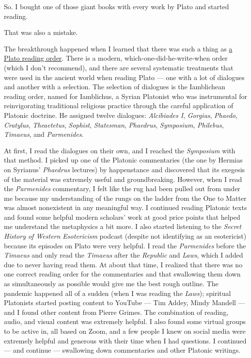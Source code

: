 \documentclass[
]{book}
\begin{document}
So. I bought one of those giant books with every work by Plato and started reading.

That was also a mistake.

The breakthrough happened when I learned that there was such a thing as \href{https://www.oxfordhandbooks.com/view/10.1093/oxfordhb/9780199935314.001.0001/oxfordhb-9780199935314-e-28\#:~:text=According\%20to\%20Iamblichus\%2C\%20for\%20example,and\%20finally\%20Timaeus\%20and\%20Parmenides.}{a Plato reading order}. There is a modern, which-one-did-he-write-when order (which I don't recommend), and there are several systematic treatments that were used in the ancient world when reading Plato --- one with a lot of dialogues and another with a selection. The selection of dialogues is the Iamblichean reading order, named for Iamblichus, a Syrian Platonist who was instrumental for reinvigorating traditional religious practice through the careful application of Platonic doctrine. He assigned twelve dialogues: \emph{Alcibiades I}, \emph{Gorgias}, \emph{Phaedo}, \emph{Cratylus}, \emph{Theaetetus}, \emph{Sophist}, \emph{Statesman}, \emph{Phaedrus}, \emph{Symposium}, \emph{Philebus}, \emph{Timaeus}, and \emph{Parmenides}.

At first, I read the dialogues on their own, and I reached the \emph{Symposium} with that method. I picked up one of the Platonic commentaries (the one by Hermias on Syrianus' \emph{Phaedrus} lectures) by happenstance and discovered that its exegesis of the material was extremely useful and groundbreaking. However, when I read the \emph{Parmenides} commentary, I felt like the rug had been pulled out from under me because my understanding of the rungs on the ladder from the One to Matter was almost nonexistent in any meaningful way. I continued reading Platonic texts and found some helpful modern scholars' work at good price points that helped me understand the metaphysics a bit more. I also started listening to the \emph{Secret History of Western Esotericism} podcast (despite not identifying as an esotericist) because its episodes on Plato were very helpful. I read the \emph{Parmenides} before the \emph{Timaeus} and only read the \emph{Timaeus} after the \emph{Republic} and \emph{Laws}, which I added due to never having read them. At about that time, I realized that there was no one correct reading order for the commentaries and that swallowing them down as simultaneously as possible would give me the best rough outline. The pandemic happened all of a sudden (when I was reading the \emph{Laws}); spiritual Platonists started posting content to YouTube --- Tim Addey, Mindy Mandell --- and I found other content from Pierre Grimes. The combination of reading, audio, and visual content was extremely helpful. I also found some virtual groups to be active in, all based on Zoom, and a few people I knew on social media were extremely helpful and generous with their time when I had questions. I continued --- and continue --- swallowing down commentaries and other Platonic writings.
\end{document}

